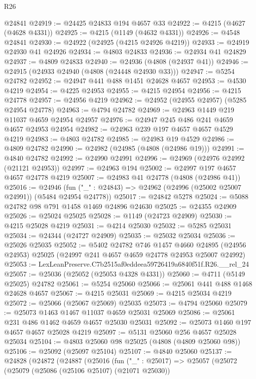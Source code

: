 \begin{lexlean}{R26}
\begin{coremodule}
    @24841
@24919 := @24425 @24833 @194 @4657 @33
@24922 := @4215 (@4627 (@4628 @4331))
@24925 := @4215 (@1149 (@4632 @4331))
@24926 := @4548 @24841
@24930 := @24922 (@24925 (@4215 @24926 @4219))
@24933 := @24919 @24930 @41 @24926
@24934 := @4803 @24833
@24936 := @24934 @41 @24829
@24937 := @4809 @24833
@24940 := @24936 (@4808 (@24937 @41))
@24946 := @24915 (@24933 @24940 (@4808 (@24448 @24930 @33)))
@24947 := @5254 @24782
@24952 := @24947 @441 @488 @1451 @24628 @4657
@24953 := @4530 @4219
@24954 := @4225 @24953
@24955 := @4215 @24954
@24956 := @4215 @24778
@24957 := @24956 @4219
@24962 := @24952 (@24955 @24957) (@5285 @24954 @24778)
@24963 := @4794 @24782
@24969 := @24963 @1449 @219 @11037 @4659 @24954 @24957
@24976 := @24947 @245 @486 @241 @4659 @4657 @24953 @24954
@24982 := @24963 @239 @197 @4657 @4657 @4529 @4219
@24983 := @4803 @24782
@24985 := @24983 @19 @4529
@24986 := @4809 @24782
@24990 := @24982 (@24985 (@4808 (@24986 @19)))
@24991 := @4840 @24782
@24992 := @24990 @24991
@24996 := @24969 (@24976 @24992 (@21121 @24953))
@24997 := @24963 @194
@25002 := @24997 @197 @4657 @4657 @24778 @4219
@25007 := @24983 @41 @24778 (@4808 (@24986 @41))
@25016 := @24946
    (fun ("_" : @24843) => @24962 (@24996 (@25002 @25007 @24991)) (@5484 @24954 @24778))
@25017 := @24842 @5278
@25024 := @5088 @24782 @98 @791 @1458 @1469 @24896 @24630
@25025 := @24355 @24909
@25026 := @25024 @25025
@25028 := @1149 (@24723 @24909)
@25030 := @4215 @25028 @4219
@25031 := @4214 @25030
@25032 := @5285 @25031
@25034 := @24344 (@24727 @24909)
@25035 := @25032 @25034
@25036 := @25026 @25035
@25052 := @5402
    @24782
    @746
    @1457
    @4660
    @24895
    (@24956 @24953)
    @25025
    (@24997 @241 @4657 @4659 @24778 @24953 @25007 @24992)
@25053 := LexLeanPreserve.C7b2515af0eddeea59726419a6840f51f.R26.__rel_24
@25057 := @25036 (@25052 (@25053 @4328 @4331))
@25060 := @4711 (@5149 @25025) @24782
@25061 := @5254 @25060
@25066 := @25061 @441 @488 @1468 @24628 @4657
@25067 := @4215 @25031
@25069 := @4215 @25034 @4219
@25072 := @25066 (@25067 @25069) @25035
@25073 := @4794 @25060
@25079 := @25073 @1463 @1467 @11037 @4659 @25031 @25069
@25086 := @25061 @231 @486 @1462 @4659 @4657 @25030 @25031
@25092 := @25073 @1460 @197 @4657 @4657 @25028 @4219
@25097 := @5131 @25060 @256 @4657 @25028 @25034
@25104 := @4803 @25060 @98 @25025 (@4808 (@4809 @25060 @98))
@25106 := @25092 (@25097 @25104)
@25107 := @4840 @25060
@25137 := @24828
    (@24872
      (@24887
        (@25016
          (fun ("_" : @25017) =>
          @25057
            (@25072
              (@25079
                (@25086 (@25106 @25107) (@21071 @25030))

\end{coremodule}
\end{lexlean}
